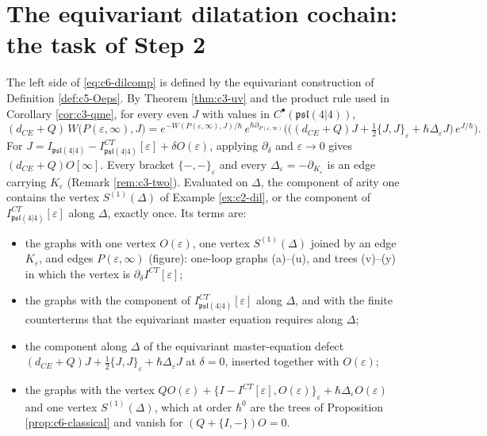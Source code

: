 \section{The equivariant dilatation cochain: the task of Step 2}

The left side of \eqref{eq:c6-dilcomp} is defined by the equivariant construction of Definition \ref{def:c5-Oeps}. By Theorem \ref{thm:c3-uv} and the product rule used in Corollary \ref{cor:c3-qme}, for every even $J$ with values in $C^\bullet(\mathfrak{psl}(4|4))$,
\begin{equation}
(d_{CE}+Q)\,W\big(P(\varepsilon,\infty),J\big)=e^{-W(P(\varepsilon,\infty),J)/\hbar}\,e^{\hbar\partial_{P(\varepsilon,\infty)}}\Big(\big((d_{CE}+Q)J+\tfrac12\{J,J\}_\varepsilon+\hbar\Delta_\varepsilon J\big)\,e^{J/\hbar}\Big).
\label{eq:c6-uvobs}
\end{equation}
For $J=I_{\mathfrak{psl}(4|4)}-I^{CT}_{\mathfrak{psl}(4|4)}[\varepsilon]+\delta O(\varepsilon)$, applying $\partial_\delta$ and $\varepsilon\to0$ gives $(d_{CE}+Q)O[\infty]$. Every bracket $\{-,-\}_\varepsilon$ and every $\Delta_\varepsilon=-\partial_{K_\varepsilon}$ is an edge carrying $K_\varepsilon$ (Remark \ref{rem:c3-two}). Evaluated on $\Delta$, the component of arity one contains the vertex $S^{(1)}(\Delta)$ of Example \ref{ex:c2-dil}, or the component of $I^{CT}_{\mathfrak{psl}(4|4)}[\varepsilon]$ along $\Delta$, exactly once. Its terms are:
\begin{itemize}
\item the graphs with one vertex $O(\varepsilon)$, one vertex $S^{(1)}(\Delta)$ joined by an edge $K_\varepsilon$, and edges $P(\varepsilon,\infty)$ (figure): one-loop graphs (a)--(u), and trees (v)--(y) in which the vertex is $\partial_\delta I^{CT}[\varepsilon]$;
\item the graphs with the component of $I^{CT}_{\mathfrak{psl}(4|4)}[\varepsilon]$ along $\Delta$, and with the finite counterterms that the equivariant master equation requires along $\Delta$;
\item the component along $\Delta$ of the equivariant master-equation defect $(d_{CE}+Q)J+\frac12\{J,J\}_\varepsilon+\hbar\Delta_\varepsilon J$ at $\delta=0$, inserted together with $O(\varepsilon)$;
\item the graphs with the vertex $QO(\varepsilon)+\{I-I^{CT}[\varepsilon],O(\varepsilon)\}_\varepsilon+\hbar\Delta_\varepsilon O(\varepsilon)$ and one vertex $S^{(1)}(\Delta)$, which at order $\hbar^0$ are the trees of Proposition \ref{prop:c6-classical} and vanish for $(Q+\{I,-\})O=0$.
\end{itemize}

